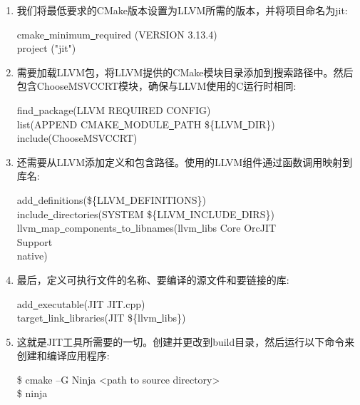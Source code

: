 \begin{enumerate}
\item 我们将最低要求的CMake版本设置为LLVM所需的版本，并将项目命名为jit:
\begin{tcolorbox}[colback=white,colframe=black]
cmake\underline{~}minimum\underline{~}required (VERSION 3.13.4) \\
project ("jit")
\end{tcolorbox}

\item 需要加载LLVM包，将LLVM提供的CMake模块目录添加到搜索路径中。然后包含Choose\allowbreak MSVCCRT模块，确保与LLVM使用的C运行时相同:
\begin{tcolorbox}[colback=white,colframe=black]
find\underline{~}package(LLVM REQUIRED CONFIG) \\
list(APPEND CMAKE\underline{~}MODULE\underline{~}PATH \$\{LLVM\underline{~}DIR\}) \\
include(ChooseMSVCCRT)
\end{tcolorbox}

\item 还需要从LLVM添加定义和包含路径。使用的LLVM组件通过函数调用映射到库名:
\begin{tcolorbox}[colback=white,colframe=black]
add\underline{~}definitions(\$\{LLVM\underline{~}DEFINITIONS\}) \\
include\underline{~}directories(SYSTEM \$\{LLVM\underline{~}INCLUDE\underline{~}DIRS\}) \\
llvm\underline{~}map\underline{~}components\underline{~}to\underline{~}libnames(llvm\underline{~}libs Core OrcJIT \\
\hspace*{6cm}Support  \\
\hspace*{6cm}native)
\end{tcolorbox}

\item 最后，定义可执行文件的名称、要编译的源文件和要链接的库:
\begin{tcolorbox}[colback=white,colframe=black]
add\underline{~}executable(JIT JIT.cpp) \\
target\underline{~}link\underline{~}libraries(JIT \$\{llvm\underline{~}libs\})
\end{tcolorbox}

\item 这就是JIT工具所需要的一切。创建并更改到build目录，然后运行以下命令来创建和编译应用程序:
\begin{tcolorbox}[colback=white,colframe=black]
\$ cmake –G Ninja <path to source directory> \\
\$ ninja
\end{tcolorbox}

\end{enumerate}

